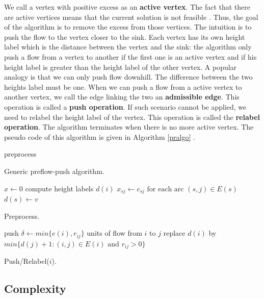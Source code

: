 We call a vertex with positive excess as an \textbf{active vertex}. The fact that there are active vertices means that the current solution is not feasible \cite{cormen}. Thus, the goal of the algorithm is to remove the excess from those vertices. The intuition is to push the flow to the vertex closer to the sink. Each vertex has its own height label which is the distance between the vertex and the sink: the algorithm only push a flow from a vertex to another if the first one is an active vertex and if his height label is greater than the height label of the other vertex. A popular analogy is that we can only push flow downhill. The difference between the two heights label must be one. When we can push a flow from a active vertex to another vertex, we call the edge linking the two an \textbf{admissible edge}. This operation is called a \textbf{push operation}. If such scenario cannot be applied, we need to relabel the height label of the vertex. This operation is called the \textbf{relabel operation}. The algorithm terminates when there is no more active vertex. The pseudo code of this algorithm is given in  Algorithm \ref{pralgo} \cite{networkflows}.


\begin{algorithm}
 preprocess\;
\caption{Generic preflow-push algorithm.}
\label{pralgo}
\end{algorithm}

\begin{algorithm}
 $x\gets 0$\;
 compute height labels $d(i)$\;
 $x_{sj}\gets c_{sj} \text{ for each arc } (s, j) \in E(s)$\;
 $d(s)\gets v$\;
\caption{Preprocess.}
\label{preprocess}
\end{algorithm}

\begin{algorithm}
  {push $\delta\gets min\{e(i), r_{ij}\}$ units of flow from $i$ to $j$\;}
\Else
   {replace $d(i)$ by $min\{d(j)+1 : (i, j) \in E(i) \text{ and } r_{ij} > 0 \}$\;}
\caption{Push/Relabel($i$).}
\end{algorithm}

\subsection{Complexity}

